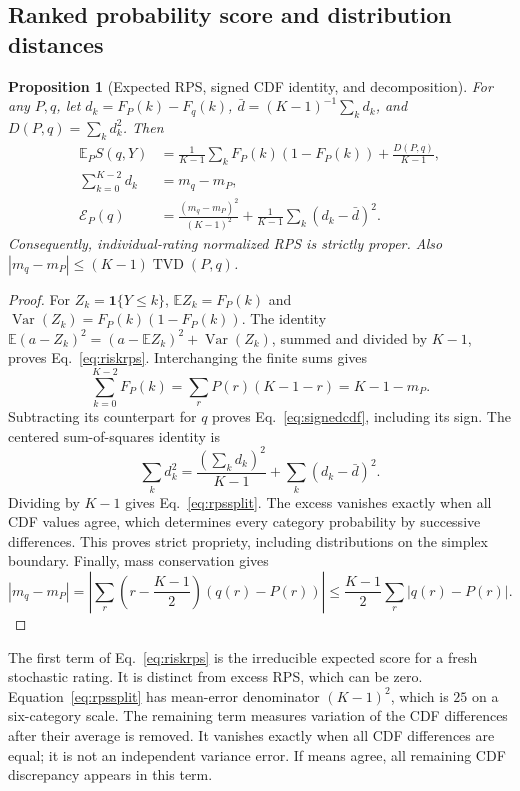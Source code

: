 \documentclass[11pt,letterpaper]{article}
\newtheorem{proposition}{Proposition}
\newcommand{\TV}{\operatorname{TVD}}
\newcommand{\Var}{\operatorname{Var}}
\newcommand{\E}{\mathbb{E}}
\begin{document}
\subsection{Ranked probability score and distribution distances}
\begin{proposition}[Expected RPS, signed CDF identity, and decomposition]\label{prop:rps}
For any $P,q$, let $d_k=F_P(k)-F_q(k)$, $\bar d=(K-1)^{-1}\sum_k d_k$, and $D(P,q)=\sum_k d_k^2$.
Then
\begin{align}
 \E_P S(q,Y)&=\frac1{K-1}\sum_k F_P(k)(1-F_P(k))+\frac{D(P,q)}{K-1},\label{eq:riskrps}\\
 \sum_{k=0}^{K-2}d_k&=m_q-m_P,\label{eq:signedcdf}\\
 \mathcal E_P(q)&=\frac{(m_q-m_P)^2}{(K-1)^2}+\frac1{K-1}\sum_k(d_k-\bar d)^2.\label{eq:rpssplit}
\end{align}
Consequently, individual-rating normalized RPS is strictly proper.
Also $|m_q-m_P|\le(K-1)\TV(P,q)$.
\end{proposition}
\begin{proof}
For $Z_k=\mathbf1\{Y\le k\}$, $\E Z_k=F_P(k)$ and $\Var(Z_k)=F_P(k)(1-F_P(k))$.
The identity $\E(a-Z_k)^2=(a-\E Z_k)^2+\Var(Z_k)$, summed and divided by $K-1$, proves Eq.~\eqref{eq:riskrps}.
Interchanging the finite sums gives
\[
 \sum_{k=0}^{K-2}F_P(k)=\sum_rP(r)(K-1-r)=K-1-m_P.
\]
Subtracting its counterpart for $q$ proves Eq.~\eqref{eq:signedcdf}, including its sign.
The centered sum-of-squares identity is
\[
 \sum_kd_k^2=\frac{(\sum_kd_k)^2}{K-1}+\sum_k(d_k-\bar d)^2.
\]
Dividing by $K-1$ gives Eq.~\eqref{eq:rpssplit}.
The excess vanishes exactly when all CDF values agree, which determines every category probability by successive differences.
This proves strict propriety, including distributions on the simplex boundary.
Finally, mass conservation gives
\[
 |m_q-m_P|=\left|\sum_r\left(r-\frac{K-1}{2}\right)(q(r)-P(r))\right|
 \le\frac{K-1}{2}\sum_r|q(r)-P(r)|.
\]
\end{proof}

The first term of Eq.~\eqref{eq:riskrps} is the irreducible expected score for a fresh stochastic rating.
It is distinct from excess RPS, which can be zero.
Equation~\eqref{eq:rpssplit} has mean-error denominator $(K-1)^2$, which is $25$ on a six-category scale.
The remaining term measures variation of the CDF differences after their average is removed.
It vanishes exactly when all CDF differences are equal; it is not an independent variance error.
If means agree, all remaining CDF discrepancy appears in this term.
\end{document}
